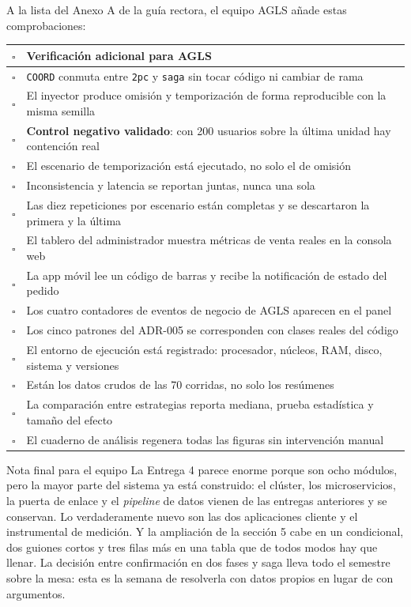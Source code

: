 \documentclass[11pt,a4paper]{article}
\begin{document}
A la lista del Anexo A de la guía rectora, el equipo AGLS añade estas comprobaciones:

\begin{center}
	\small
	\begin{tabular}{@{}p{0.7cm}p{14.2cm}@{}}
		\toprule
		\textbf{$\square$} & \textbf{Verificación adicional para AGLS} \\
		\midrule
		$\square$ & \texttt{COORD} conmuta entre \texttt{2pc} y \texttt{saga} sin tocar código ni cambiar de rama \\
		$\square$ & El inyector produce omisión y temporización de forma reproducible con la misma semilla \\
		$\square$ & \textbf{Control negativo validado}: con 200 usuarios sobre la última unidad hay contención real \\
		$\square$ & El escenario de temporización está ejecutado, no solo el de omisión \\
		$\square$ & Inconsistencia y latencia se reportan juntas, nunca una sola \\
		$\square$ & Las diez repeticiones por escenario están completas y se descartaron la primera y la última \\
		$\square$ & El tablero del administrador muestra métricas de venta reales en la consola web \\
		$\square$ & La app móvil lee un código de barras y recibe la notificación de estado del pedido \\
		$\square$ & Los cuatro contadores de eventos de negocio de AGLS aparecen en el panel \\
		$\square$ & Los cinco patrones del ADR-005 se corresponden con clases reales del código \\
		$\square$ & El entorno de ejecución está registrado: procesador, núcleos, RAM, disco, sistema y versiones \\
		$\square$ & Están los datos crudos de las 70 corridas, no solo los resúmenes \\
		$\square$ & La comparación entre estrategias reporta mediana, prueba estadística y tamaño del efecto \\
		$\square$ & El cuaderno de análisis regenera todas las figuras sin intervención manual \\
		\bottomrule
	\end{tabular}
\end{center}

\vspace{6pt}
\begin{uteqbox}{Nota final para el equipo}
	La Entrega 4 parece enorme porque son ocho módulos, pero la mayor parte del sistema ya está construido: el clúster, los microservicios, la puerta de enlace y el \emph{pipeline} de datos vienen de las entregas anteriores y se conservan. Lo verdaderamente nuevo son las dos aplicaciones cliente y el instrumental de medición. Y la ampliación de la sección 5 cabe en un condicional, dos guiones cortos y tres filas más en una tabla que de todos modos hay que llenar. La decisión entre confirmación en dos fases y saga lleva todo el semestre sobre la mesa: esta es la semana de resolverla con datos propios en lugar de con argumentos.
\end{uteqbox}
\end{document}
